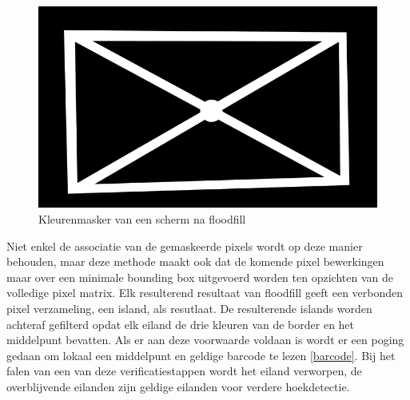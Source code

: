 \begin{figure}[H]
\centering
\includegraphics[scale=0.5]{img/mask.png}
\caption{Kleurenmasker van een scherm na floodfill}
\end{figure}

\noindent
Niet enkel de associatie van de gemaskeerde pixels wordt op deze manier behouden, maar deze methode maakt ook dat de komende pixel bewerkingen maar over een minimale bounding box uitgevoerd worden ten opzichten van de volledige pixel matrix. Elk resulterend resultaat van floodfill geeft een verbonden pixel verzameling, een island, als resutlaat. De resulterende islands worden achteraf gefilterd opdat elk eiland de drie kleuren van de border en het middelpunt bevatten. Als er aan deze voorwaarde voldaan is wordt er een poging gedaan om lokaal een middelpunt en geldige barcode te lezen \ref{barcode}. Bij het falen van een van deze verificatiestappen wordt het eiland verworpen, de overblijvende eilanden zijn geldige eilanden voor verdere hoekdetectie.


